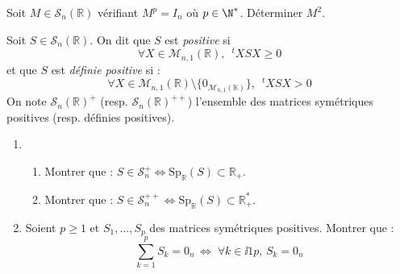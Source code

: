 \documentclass[a4paper,twoside,french,11pt]{VcCours}
\begin{document}
\begin{Exercice}{} Soit $M \in  \mathcal{S}_{n}(\mathbb{R})$ vérifiant $M^{p}= I_{n}$ où $p \in \N^{*}$. Déterminer $M^2$.
\end{Exercice}



\begin{Exercice}{} Soit $S \in \mathcal{S}_n(\mathbb{R})$. On dit que $S$ est \textit{positive} si
$$ \forall X \in \mathcal{M}_{n,1}(\mathbb{R}), \; ~^tX S X \geq 0$$
et que $S$ est \textit{définie positive} si :
$$ \forall X \in \mathcal{M}_{n,1}(\mathbb{R}) \setminus \lbrace 0_{\mathcal{M}_{n,1}(\mathbb{K})} \rbrace, \; ~^tX S X > 0$$
On note $\mathcal{S}_n(\mathbb{R})^+$ (resp. $\mathcal{S}_n(\mathbb{R})^{++}$) l'ensemble des matrices symétriques positives (resp. définies positives).

\begin{enumerate}
\item 
\begin{enumerate}
\item Montrer que : $S \in \mathcal{S}_n^+ \Longleftrightarrow \textrm{Sp}_{\mathbb{R}}(S) \subset \mathbb{R}_+$.
\item Montrer que : $S \in \mathcal{S}_n^{++} \Longleftrightarrow \textrm{Sp}_{\mathbb{R}}(S) \subset \mathbb{R}_+^{*}$.
\end{enumerate}
\item Soient $p \geq 1$ et $S_1, \ldots, S_p$ des matrices symétriques positives. Montrer que :
$$ \sum_{k=1}^p S_k = 0_n  \, \Longleftrightarrow \;  \forall k \in \ii{1}{p}, \, S_k = 0_n $$
\end{enumerate}
\end{Exercice}
\end{document}
